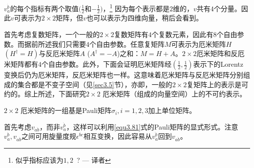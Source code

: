 $v_a^{\dot{b}}$的每个指标有两个取值$(\frac{1}{2}$和$-\frac{1}{2})$，\footnote{似乎指标应该为$1, 2$~? --- 译者} 因为每个表示都是$2$维的，$v$共有$4$个分量。因此$v$可表示为$2 \times 2$矩阵，但$v$也可以表示为四维向量，稍后会看到。

首先考虑复数矩阵，一个一般的$2 \times 2$复数矩阵有$4$个复数元素，因此有$8$个自由参数。而据前所述我们只需要$4$个自由参数。任意复矩阵$M$可表示为厄米矩阵$H$$(H^\dag = H)$与反厄米矩阵$A$ ($A^\dag = -A$)之和：$M = H + A$。$2 \times 2$厄米矩阵和反厄米矩阵都有$4$个自由参数。此外，下面会证明厄米矩阵经$(\frac{1}{2}, \frac{1}{2})$表示下的Lorentz变换后仍为厄米矩阵，反厄米矩阵也一样。这意味着厄米矩阵与反厄米矩阵分别组成的集合都是不变子空间（见\ref{sec3.5}节），亦即，一般的$2 \times 2$复矩阵上的表示是可约的。综上所述，下面研究$2 \times 2$ 厄米矩阵（组成的向量空间）上的不可约表示。

$2 \times 2$ 厄米矩阵的一组基是Pauli矩阵$\sigma_i, i = 1, 2, 3$加上单位矩阵。

首先考虑$v_{a\dot{b}}$，而非$v_a^{\dot{b}}$，这样可以利用\eqref{equ3.81}式的Pauli矩阵的显式形式。注意$v_a^{\dot{b}}, v_{a \dot{b}}$之间可用旋量度规$\epsilon^{\dot{bc}}$相互变换，因此容易从$v_a^{\dot{b}}$回到$v_{a \dot{b}}$。

